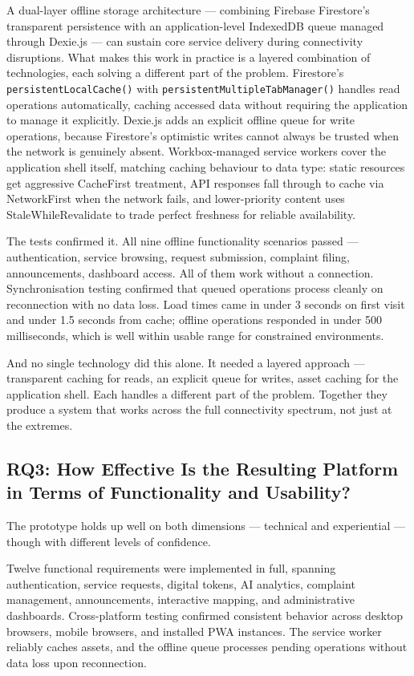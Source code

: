 A dual-layer offline storage architecture --- combining Firebase Firestore's transparent persistence with an application-level IndexedDB queue managed through Dexie.js --- can sustain core service delivery during connectivity disruptions. What makes this work in practice is a layered combination of technologies, each solving a different part of the problem. Firestore's \texttt{persistentLocalCache()} with \texttt{persistentMultipleTabManager()} handles read operations automatically, caching accessed data without requiring the application to manage it explicitly. Dexie.js adds an explicit offline queue for write operations, because Firestore's optimistic writes cannot always be trusted when the network is genuinely absent. Workbox-managed service workers cover the application shell itself, matching caching behaviour to data type: static resources get aggressive CacheFirst treatment, API responses fall through to cache via NetworkFirst when the network fails, and lower-priority content uses StaleWhileRevalidate to trade perfect freshness for reliable availability.

The tests confirmed it. All nine offline functionality scenarios passed --- authentication, service browsing, request submission, complaint filing, announcements, dashboard access. All of them work without a connection. Synchronisation testing confirmed that queued operations process cleanly on reconnection with no data loss. Load times came in under 3 seconds on first visit and under 1.5 seconds from cache; offline operations responded in under 500 milliseconds, which is well within usable range for constrained environments.

And no single technology did this alone. It needed a layered approach --- transparent caching for reads, an explicit queue for writes, asset caching for the application shell. Each handles a different part of the problem. Together they produce a system that works across the full connectivity spectrum, not just at the extremes.

\subsection{RQ3: How Effective Is the Resulting Platform in Terms of Functionality and Usability?}

The prototype holds up well on both dimensions --- technical and experiential --- though with different levels of confidence.

Twelve functional requirements were implemented in full, spanning authentication, service requests, digital tokens, AI analytics, complaint management, announcements, interactive mapping, and administrative dashboards. Cross-platform testing confirmed consistent behavior across desktop browsers, mobile browsers, and installed PWA instances. The service worker reliably caches assets, and the offline queue processes pending operations without data loss upon reconnection.

